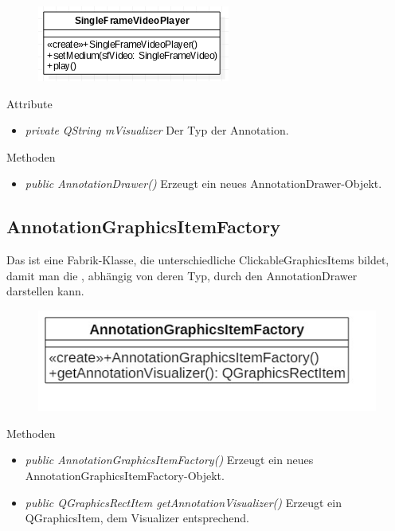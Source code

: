 \begin{figure}[H]
	\centering
	\includegraphics[scale=0.5]{img/Klassendiagramm/Klassen/View/AnnotationDrawer}
	\label{fig:annotationDrawer}
\end{figure}

Attribute
\begin{itemize}
	\item\textit{private QString mVisualizer} 
	Der Typ der \gls{Annotation}.   
\end{itemize}

Methoden
\begin{itemize}
	\item\textit{public AnnotationDrawer()} 
	Erzeugt ein neues AnnotationDrawer-Objekt.
\end{itemize}
  
\subsection*{AnnotationGraphicsItemFactory}
Das ist eine Fabrik-Klasse, die unterschiedliche ClickableGraphicsItems bildet, damit man die , abhängig von deren Typ, durch den AnnotationDrawer darstellen kann.

\begin{figure}[H]
	\centering
	\includegraphics[scale=0.5]{img/Klassendiagramm/Klassen/View/AnnotationGraphicsItemFactory}
	\label{fig:annotationGraphicsItemFactory}
\end{figure}

Methoden
\begin{itemize}
	\item\textit{public AnnotationGraphicsItemFactory()} 
	Erzeugt ein neues AnnotationGraphicsItemFactory-Objekt.
	\item\textit{public QGraphicsRectItem getAnnotationVisualizer()} 
	Erzeugt ein QGraphicsItem, dem Visualizer entsprechend.
\end{itemize}
 
